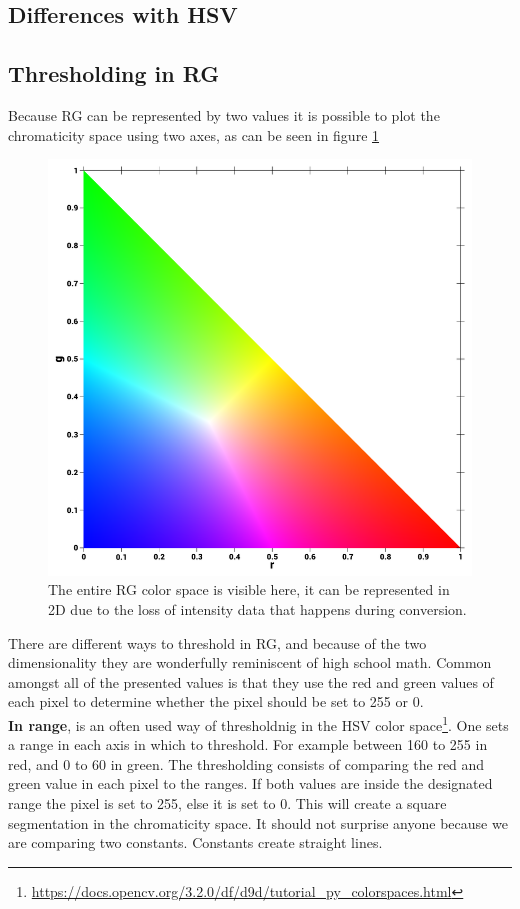 \subsection{Differences with HSV}
\subsection{Thresholding in RG}
Because RG can be represented by two values it is possible to plot the  chromaticity space using two axes, as can be seen in figure \ref{fig:rgbNorm}
\begin{figure}[H]
	\centering
	\includegraphics[width=0.5\linewidth]{figure/Analysis/normRGB.png}
	\caption{The entire RG color space is visible here, it can be represented in 2D due to the loss of intensity data that happens during conversion.}
	\label{fig:rgbNorm}
\end{figure}
There are different ways to threshold in RG, and because of the two dimensionality they are wonderfully reminiscent of high school math. Common amongst all of the presented values is that they use the red and green values of each pixel to determine whether the pixel should be set to 255
 or 0.\\
\textbf{In range}, is an often used way of thresholdnig in the HSV color space\footnote{\url{https://docs.opencv.org/3.2.0/df/d9d/tutorial\_py\_colorspaces.html}}. One sets a range in each axis in which to threshold. For example between 160 to 255 in red, and 0 to 60 in green. The thresholding consists of comparing the red and green value in each pixel to the ranges. If both values are inside the designated range the pixel is set to 255, else it is set to 0. This will create a square segmentation in the chromaticity space. It should not surprise anyone because we are comparing two constants. Constants create straight lines. \\

